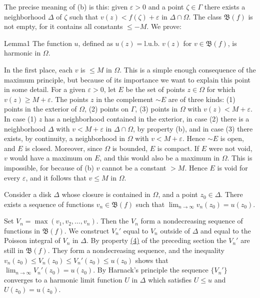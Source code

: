 The precise meaning of (b) is this: given $\varepsilon > 0$ and a point $\zeta \in \Gamma$ there exists a neighborhood $\Delta$ of $\zeta$ such that $v(z) < f(\zeta) + \varepsilon$ in $\Delta \cap \Omega$. The class $\mathfrak{B}(f)$ is not empty, for it contains all constants $\leq -M$. We prove:

\begin{originalstatement}{Lemma}{1}\label{lem:6.1}
The function $u$, defined as $u(z) = \text{l.u.b. } v(z)$ for $v \in \mathfrak{B}(f)$, is harmonic in $\Omega$.
\end{originalstatement}
In the first place, each $v$ is $\leq M$ in $\Omega$. This is a simple enough consequence of the maximum principle, but because of its importance we want to explain this point in some detail. For a given $\varepsilon > 0$, let $E$ be the set of points $z \in \Omega$ for which $v(z) \geq M + \varepsilon$. The points $z$ in the complement
$\sim E$ are of three kinds: (1) points in the exterior of $\Omega$, (2) points on $\Gamma$, (3) points in $\Omega$ with $v(z) < M + \varepsilon$. In case (1) $z$ has a neighborhood contained in the exterior, in case (2) there is a neighborhood $\Delta$ with $v < M + \varepsilon$ in $\Delta \cap \Omega$, by property (b), and in case (3) there exists, by continuity, a neighborhood in $\Omega$ with $v < M + \varepsilon$. Hence $\sim E$ is open, and $E$ is closed. Moreover, since $\Omega$ is bounded, $E$ is compact. If $E$ were not void, $v$ would have a maximum on $E$, and this would also be a maximum in $\Omega$. This is impossible, for because of (b) $v$ cannot be a constant $> M$. Hence $E$ is void for every $\varepsilon$, and it follows that $v \leq M$ in $\Omega$.

Consider a disk $\Delta$ whose closure is contained in $\Omega$, and a point $z_0 \in \Delta$. There exists a sequence of functions $v_n \in \mathfrak{B}(f)$ such that $\lim_{n \to \infty} v_n(z_0) = u(z_0)$.

Set $V_{n} = \max (v_{1}, v_{2}, \ldots, v_{n})$. Then the $V_{n}$ form a nondecreasing sequence of functions in $\mathfrak{B}(f)$. We construct $V_{n}'$ equal to $V_{n}$ outside of $\Delta$ and equal to the Poisson integral of $V_{n}$ in $\Delta$. By property \hyperref[eq:6.4]{(4)} of the preceding section the $V_{n}'$ are still in $\mathfrak{B}(f)$. They form a nondecreasing sequence, and the inequality $v_{n}(z_{0}) \leq V_{n}(z_{0}) \leq V_{n}'(z_{0}) \leq u(z_{0})$ shows that $\lim_{n \to \infty} V_{n}'(z_{0}) = u(z_{0})$. By Harnack's principle the sequence $\{V_{n}'\}$ converges to a harmonic limit function $U$ in $\Delta$ which satisfies $U \leq u$ and $U(z_{0}) = u(z_{0})$.

